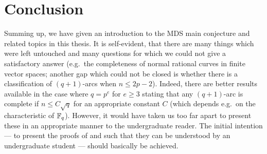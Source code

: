 \section*{Conclusion}

Summing up, we have given an introduction to the MDS main conjecture and related topics in this thesis.
It is self-evident, that there are many things which were left untouched and many questions for which we could not give a satisfactory answer (e.g.~the completeness of normal rational curves in finite vector spaces; another gap which could not be closed is whether there is a classification of $(q+1)$-arcs when $n\leq 2p-2$).
Indeed, there are better results available in the case where $q=p^e$ for $e\geq 3$ stating that any $(q+1)$-arc is complete if $n\leq C\sqrt q$ for an appropriate constant $C$ (which depends e.g.~on the characteristic of $\mathbb{F}_{q}$).
However, it would have taken us too far apart to present these in an appropriate manner to the undergraduate reader.
The initial intention --- to present the proofs of  and  such that they can be understood by an undergraduate student --- should basically be achieved.
